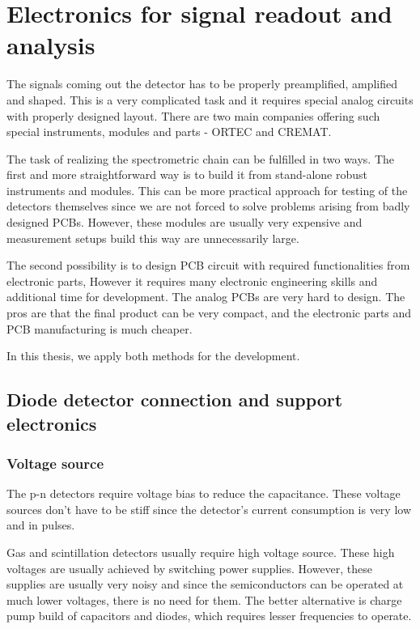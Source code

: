 
\chapter{Electronics for signal readout and analysis}
The signals coming out the detector has to be properly preamplified, amplified and shaped. This is a very complicated task and it requires special analog circuits with properly designed layout. 
There are two main companies offering such special instruments, modules and parts - ORTEC and CREMAT.
\par
The task of realizing the spectrometric chain can be fulfilled in two ways. The first and more straightforward way is to build it from stand-alone robust instruments and modules. This can be more practical approach for testing of the detectors themselves since we are not forced to solve problems arising from badly designed PCBs. However, these modules are usually very expensive and measurement setups build this way are unnecessarily large.
\par
The second possibility is to design PCB circuit with required functionalities from electronic parts, However it requires many electronic engineering skills and additional time for development. The analog PCBs are very hard to design. The pros are that the final product can be very compact, and the electronic parts and PCB manufacturing is much cheaper. 
\par
In this thesis, we apply both methods for the development.



\section{Diode detector connection and support electronics}
\subsection{Voltage source}
The p-n detectors require voltage bias to reduce the capacitance.
These voltage sources don't have to be stiff since the detector's current consumption is very low and in pulses.
\par
Gas and scintillation detectors usually require high voltage source. These high voltages are usually achieved by switching power supplies.
However, these supplies are usually very noisy and since the semiconductors can be operated at much lower voltages, there is no need for them. The better alternative is charge pump build of capacitors and diodes, which requires lesser frequencies to operate.
